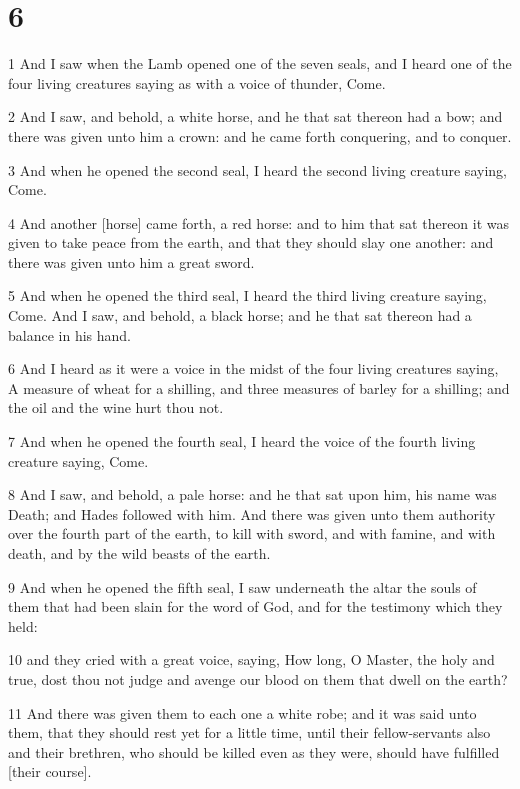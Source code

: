 \chapter{6}

\par 1 And I saw when the Lamb opened one of the seven seals, and I heard one of the four living creatures saying as with a voice of thunder, Come.
\par 2 And I saw, and behold, a white horse, and he that sat thereon had a bow; and there was given unto him a crown: and he came forth conquering, and to conquer.
\par 3 And when he opened the second seal, I heard the second living creature saying, Come.
\par 4 And another [horse] came forth, a red horse: and to him that sat thereon it was given to take peace from the earth, and that they should slay one another: and there was given unto him a great sword.
\par 5 And when he opened the third seal, I heard the third living creature saying, Come. And I saw, and behold, a black horse; and he that sat thereon had a balance in his hand.
\par 6 And I heard as it were a voice in the midst of the four living creatures saying, A measure of wheat for a shilling, and three measures of barley for a shilling; and the oil and the wine hurt thou not.
\par 7 And when he opened the fourth seal, I heard the voice of the fourth living creature saying, Come.
\par 8 And I saw, and behold, a pale horse: and he that sat upon him, his name was Death; and Hades followed with him. And there was given unto them authority over the fourth part of the earth, to kill with sword, and with famine, and with death, and by the wild beasts of the earth.
\par 9 And when he opened the fifth seal, I saw underneath the altar the souls of them that had been slain for the word of God, and for the testimony which they held:
\par 10 and they cried with a great voice, saying, How long, O Master, the holy and true, dost thou not judge and avenge our blood on them that dwell on the earth?
\par 11 And there was given them to each one a white robe; and it was said unto them, that they should rest yet for a little time, until their fellow-servants also and their brethren, who should be killed even as they were, should have fulfilled [their course].

